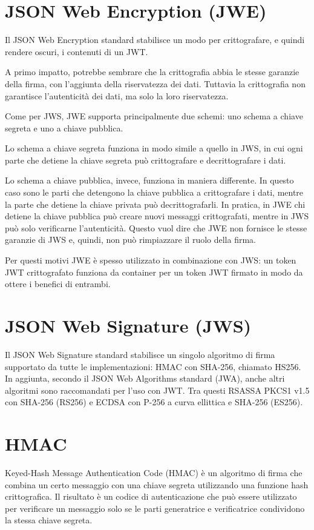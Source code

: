 \documentclass{article}
\begin{document}
\section{JSON Web Encryption (JWE)}
Il JSON Web Encryption standard stabilisce un modo per crittografare, e quindi rendere oscuri, i contenuti di un JWT.

A primo impatto, potrebbe sembrare che la crittografia abbia le stesse garanzie della firma, con l'aggiunta della riservatezza dei dati.
Tuttavia la crittografia non garantisce l'autenticità dei dati, ma solo la loro riservatezza.

Come per JWS, JWE supporta principalmente due schemi: uno schema a chiave segreta e uno a chiave pubblica.

Lo schema a chiave segreta funziona in modo simile a quello in JWS, in cui ogni parte che detiene la chiave segreta può crittografare e decrittografare i dati.

Lo schema a chiave pubblica, invece, funziona in maniera differente.
In questo caso sono le parti che detengono la chiave pubblica a crittografare i dati, mentre la parte che detiene la chiave privata può decrittografarli.
In pratica, in JWE chi detiene la chiave pubblica può creare nuovi messaggi crittografati, mentre in JWS può solo verificarne l'autenticità.
Questo vuol dire che JWE non fornisce le stesse garanzie di JWS e, quindi, non può rimpiazzare il ruolo della firma.

Per questi motivi JWE è spesso utilizzato in combinazione con JWS: un token JWT crittografato funziona da container per un token JWT firmato in modo da ottere i benefici di entrambi.

\section{JSON Web Signature (JWS)}
Il JSON Web Signature standard stabilisce un singolo algoritmo di firma supportato da tutte le implementazioni: HMAC con SHA-256, chiamato HS256.
In aggiunta, secondo il JSON Web Algorithms standard (JWA), anche altri algoritmi sono raccomandati per l'uso con JWT.
Tra questi RSASSA PKCS1 v1.5 con SHA-256 (RS256) e ECDSA con P-256 a curva ellittica e SHA-256 (ES256).

\section{HMAC}
Keyed-Hash Message Authentication Code (HMAC) è un algoritmo di firma che combina un certo messaggio con una chiave segreta utilizzando una funzione hash crittografica.
Il risultato è un codice di autenticazione che può essere utilizzato per verificare un messaggio solo se le parti generatrice e verificatrice condividono la stessa chiave segreta.
\end{document}

